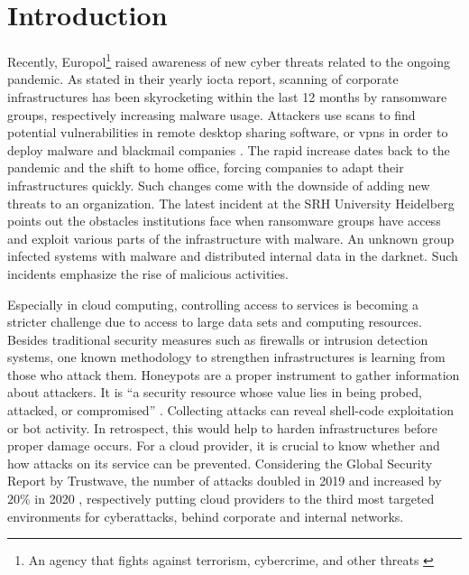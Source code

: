 \chapter{Introduction}

Recently, Europol\footnote{An agency that fights against terrorism, cybercrime, and other threats \cite{europol2021}} raised awareness of new cyber threats related to the ongoing pandemic.
As stated in their yearly \ac{iocta} report, scanning of corporate infrastructures has been skyrocketing within the last 12 months by ransomware groups, respectively increasing malware usage.
Attackers use scans to find potential vulnerabilities in remote desktop sharing software, or \acp{vpn} in order to deploy malware and blackmail companies \cite{iocta2020}.
The rapid increase dates back to the pandemic and the shift to home office, forcing companies to adapt their infrastructures quickly.
Such changes come with the downside of adding new threats to an organization.
The latest incident at the SRH University Heidelberg points out the obstacles institutions face when ransomware groups have access and exploit various parts of the infrastructure with malware.
An unknown group infected systems with malware and distributed internal data in the darknet.
Such incidents emphasize the rise of malicious activities.

Especially in cloud computing, controlling access to services is becoming a stricter challenge due to access to large data sets and computing resources.
Besides traditional security measures such as firewalls or intrusion detection systems, one known methodology to strengthen infrastructures is learning from those who attack them.
Honeypots are a proper instrument to gather information about attackers.
It is \enquote{a security resource whose value lies in being probed, attacked, or compromised} \cite{Spitzner2003}.
Collecting attacks can reveal shell-code exploitation or bot activity.
In retrospect, this would help to harden infrastructures before proper damage occurs.
For a cloud provider, it is crucial to know whether and how attacks on its service can be prevented.
Considering the Global Security Report by Trustwave, the number of attacks doubled in 2019 and increased by $20\%$ in 2020 \cite{fahim2020}, respectively putting cloud providers to the third most targeted environments for cyberattacks, behind corporate and internal networks.


